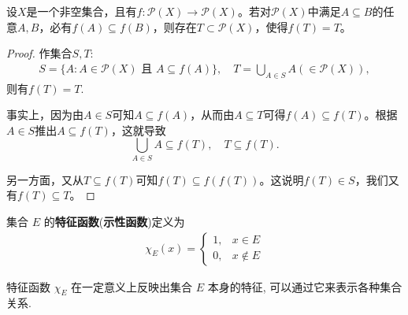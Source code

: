 \documentclass[../../main.tex]{subfiles}%
\begin{document}
\begin{proposition}[单调映射的不动点]\label{proposition:单调映射的不动点}
设\(X\)是一个非空集合，且有\(f:\mathcal{P}(X)\to\mathcal{P}(X)\)。若对\(\mathcal{P}(X)\)中满足\(A\subseteq B\)的任意\(A,B\)，必有\(f(A)\subseteq f(B)\)，则存在\(T\subset\mathcal{P}(X)\)，使得\(f(T)=T\)。
\end{proposition}
\begin{proof}
作集合\(S,T\):
\begin{align*}
S=\{A:A\in\mathcal{P}(X)\text{ 且 }A\subseteq f(A)\},\quad T=\bigcup_{A\in S}A(\in\mathcal{P}(X)),
\end{align*}
则有\(f(T)=T\).

事实上，因为由\(A\in S\)可知\(A\subseteq f(A)\)，从而由\(A\subseteq T\)可得\(f(A)\subseteq f(T)\)。根据\(A\in S\)推出\(A\subseteq f(T)\)，这就导致
\[
\bigcup_{A\in S}A\subseteq f(T),\quad T\subseteq f(T).
\]

另一方面，又从\(T\subseteq f(T)\)可知\(f(T)\subseteq f(f(T))\)。这说明\(f(T)\in S\)，我们又有\(f(T)\subseteq T\)。
\end{proof}

\begin{definition}
集合 $E$ 的\textbf{特征函数}(\textbf{示性函数})定义为
\begin{align*}
\chi_E(x) = 
\begin{cases}
1, & x \in E\\
0, & x \notin E
\end{cases}
\end{align*}
\end{definition}
\begin{note}
特征函数 $\chi_E$ 在一定意义上反映出集合 $E$ 本身的特征, 可以通过它来表示各种集合关系.
\end{note}
\end{document}
